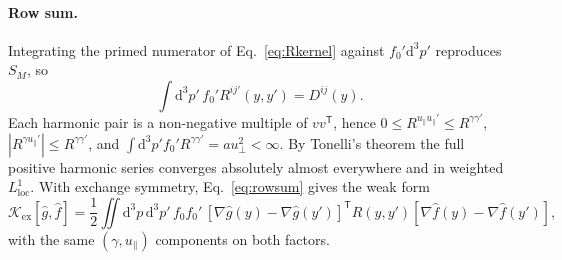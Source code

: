 \documentclass[11pt,a4paper]{article}
\numberwithin{equation}{section}
\newcommand{\dd}{\mathrm{d}}
\newcommand{\upar}{u_\parallel}
\newcommand{\uperp}{u_\perp}
\newcommand{\fh}{\hat f}
\newcommand{\Kex}{\mathcal K_{\mathrm{ex}}}
\begin{document}
\paragraph{Row sum.} Integrating the primed numerator of Eq.~\eqref{eq:Rkernel}
against $f_0'\dd^3p'$ reproduces $S_M$, so
\begin{equation}
\int\dd^3p'\,f_0'R^{ij'}(y,y')=D^{ij}(y).
\label{eq:rowsum}
\end{equation}
Each harmonic pair is a non-negative multiple of $vv^{\mathsf T}$, hence
$0\le R^{\upar\upar'}\le R^{\gamma\gamma'}$, $|R^{\gamma\upar'}|\le R^{\gamma\gamma'}$, and
$\int\dd^3p'f_0'R^{\gamma\gamma'}=a\uperp^2<\infty$. By Tonelli's theorem the full
positive harmonic series converges absolutely almost everywhere and in
weighted $L^1_{\mathrm{loc}}$. With exchange symmetry, Eq.~\eqref{eq:rowsum} gives the
weak form
\begin{equation}
\Kex[\hat g,\fh]=\frac12\iint\dd^3p\,\dd^3p'\,f_0f_0'\,
[\nabla\hat g(y)-\nabla\hat g(y')]^{\mathsf T}R(y,y')[\nabla\fh(y)-\nabla\fh(y')],
\end{equation}
with the same $(\gamma,\upar)$ components on both factors.
\end{document}
